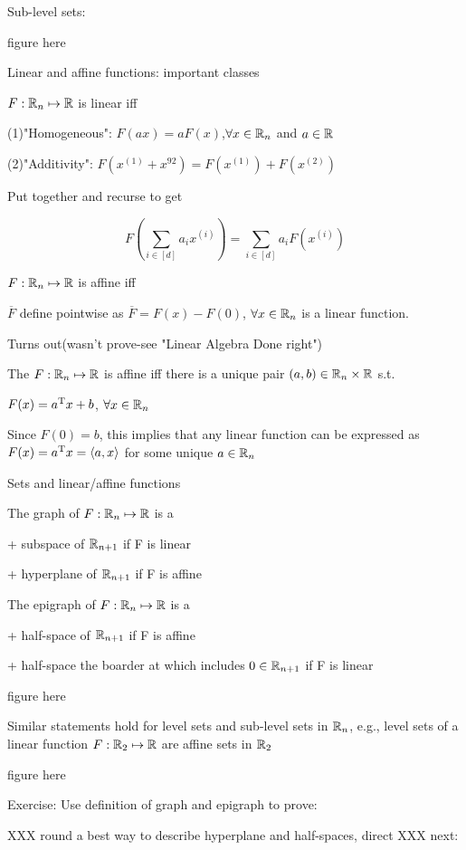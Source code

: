 Sub-level sets:

figure here



Linear and affine functions: important classes

$F:\mathbb{R}_{n}\mapsto\mathbb{R}$ is linear iff

(1)"Homogeneous": $F(ax)=aF(x)$,$ \forall x\in\mathbb{R}_{n}$ and $a\in\mathbb{R}$

(2)"Additivity":  $F(x^{(1)}+x^{92})=F(x^{(1)})+F(x^{(2)})$

Put together and recurse to get 


$$F(\sum_{i\in [d]}^{}a_{i}x^{(i)})=\sum_{i\in [d]}^{}a_{i}F(x^{(i)})$$


$F:\mathbb{R}_{n}\mapsto\mathbb{R}$ is affine iff

$\overline{F}$ define pointwise as $\overline{F}=F(x)-F(0)$, $\forall x\in\mathbb{R}_{n}$ is a linear function.


Turns out(wasn't prove-see "Linear Algebra Done right")

The $F:\mathbb{R}_{n}\mapsto\mathbb{R}$ is affine iff there is a unique pair $(a,b)\in\mathbb{R}_{n}\times\mathbb{R}$  s.t. 

$F(x)=a^{{\rm T}} x+b$,  $\forall x\in\mathbb{R}_{n}$

Since $F(0)=b$, this implies that any linear function can be expressed as $F(x)=a^{{\rm T}} x=\langle a,x\rangle$ for some unique $a\in\mathbb{R}_{n}$


Sets and linear/affine functions

The graph of $F:\mathbb{R}_{n}\mapsto\mathbb{R}$ is a 

+ subspace of $\mathbb{R}_{n+1}$ if F is linear

+ hyperplane of $\mathbb{R}_{n+1}$ if F is affine


The epigraph of $F:\mathbb{R}_{n}\mapsto\mathbb{R}$ is a 

+ half-space of $\mathbb{R}_{n+1}$ if F is affine

+ half-space the boarder at which includes $0\in\mathbb{R}_{n+1}$ if F is linear

figure here


Similar statements hold for level sets and sub-level sets in $\mathbb{R}_{n}$, e.g., level sets of a linear function $F:\mathbb{R}_{2}\mapsto\mathbb{R}$ are affine sets in $\mathbb{R}_{2}$

figure here


Exercise: Use definition of graph and epigraph to prove:

XXX round a best way to describe hyperplane and half-spaces, direct XXX next:

